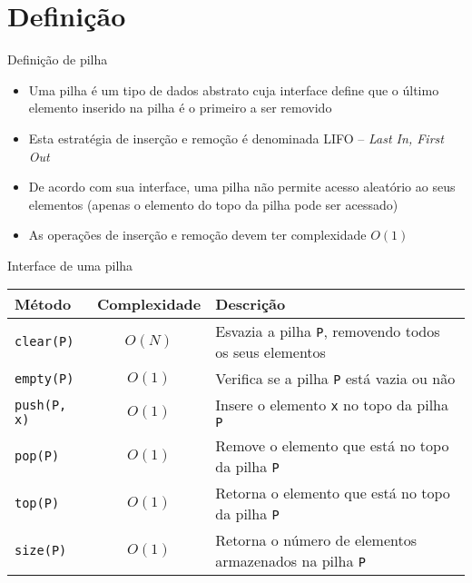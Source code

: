 \section{Definição}

\begin{frame}[fragile]{Definição de pilha}

    \begin{itemize}
        \item Uma pilha é um tipo de dados abstrato cuja interface define que o último elemento
            inserido na pilha é o primeiro a ser removido

        \item Esta estratégia de inserção e remoção é denominada LIFO -- \textit{Last In, First
            Out}

        \item De acordo com sua interface, uma pilha não permite acesso aleatório ao seus
            elementos (apenas o elemento do topo da pilha pode ser acessado)

        \item As operações de inserção e remoção devem ter complexidade $O(1)$

    \end{itemize}

\end{frame}

\begin{frame}[fragile]{Interface de uma pilha}

    \begin{table}
        \centering
        \begin{tabularx}{0.95\textwidth}{lcX}
            \toprule
            \textbf{Método} & \textbf{Complexidade} & \textbf{Descrição} \\
            \midrule
            \texttt{clear(P)} & $O(N)$ & Esvazia a pilha \texttt{P}, removendo todos os seus elementos \\
            \rowcolor[gray]{0.8}
            \texttt{empty(P)} & $O(1)$ & Verifica se a pilha \texttt{P} está vazia ou não \\
            \texttt{push(P, x)} & $O(1)$ & Insere o elemento \texttt{x} no topo da pilha \texttt{P} \\
            \rowcolor[gray]{0.8}
            \texttt{pop(P)} & $O(1)$ & Remove o elemento que está no topo da pilha \texttt{P} \\
            \texttt{top(P)} & $O(1)$ & Retorna o elemento que está no topo da pilha \texttt{P} \\
            \rowcolor[gray]{0.8}
            \texttt{size(P)} & $O(1)$ & Retorna o número de elementos armazenados na pilha \texttt{P} \\
            \bottomrule
        \end{tabularx}
    \end{table}
\end{frame}

